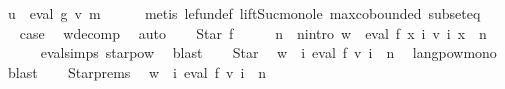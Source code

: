 \begin{isabellebody}
\ {\isachardoublequoteopen}u{\isacharprime}{\kern0pt}\ {\isasymin}\ eval\ g\ {\isacharparenleft}{\kern0pt}v\ {\isacharquery}{\kern0pt}m{\isacharparenright}{\kern0pt}{\isachardoublequoteclose}\isanewline
\ \ \ \ \isamarkupfalse%
\ {\isacharparenleft}{\kern0pt}metis\ le{\isacharunderscore}{\kern0pt}fun{\isacharunderscore}{\kern0pt}def\ lift{\isacharunderscore}{\kern0pt}Suc{\isacharunderscore}{\kern0pt}mono{\isacharunderscore}{\kern0pt}le\ max{\isachardot}{\kern0pt}cobounded{}\ subset{\isacharunderscore}{\kern0pt}eq{\isacharparenright}{\kern0pt}\isanewline
\ \ \isamarkupfalse%
\ \isamarkupfalse%
\ {\isacharquery}{\kern0pt}case\ \isamarkupfalse%
\ w{\isacharunderscore}{\kern0pt}decomp\ \isamarkupfalse%
\ auto\isanewline
{}\isamarkupfalse%
\isanewline
\ \ \isamarkupfalse%
\ {\isacharparenleft}{\kern0pt}Star\ f{\isacharparenright}{\kern0pt}\isanewline
\ \ \isamarkupfalse%
\ \isamarkupfalse%
\ n\ \ n{\isacharunderscore}{\kern0pt}intro{\isacharcolon}{\kern0pt}\ {\isachardoublequoteopen}w\ {\isasymin}\ {\isacharparenleft}{\kern0pt}eval\ f\ {\isacharparenleft}{\kern0pt}{\isasymlambda}x{\isachardot}{\kern0pt}\ {\isasymUnion}i{\isachardot}{\kern0pt}\ v\ i\ x{\isacharparenright}{\kern0pt}{\isacharparenright}{\kern0pt}\ {\isacharcircum}{\kern0pt}{\isacharcircum}{\kern0pt}\ n{\isachardoublequoteclose}\isanewline
\ \ \ \ \isamarkupfalse%
\ eval{\isachardot}{\kern0pt}simps{\isacharparenleft}{\kern0pt}{}{\isacharparenright}{\kern0pt}\ star{\isacharunderscore}{\kern0pt}pow\ \isamarkupfalse%
\ blast\isanewline
\ \ \isamarkupfalse%
\ Star\ \isamarkupfalse%
\ {\isachardoublequoteopen}w\ {\isasymin}\ {\isacharparenleft}{\kern0pt}{\isasymUnion}i{\isachardot}{\kern0pt}\ eval\ f\ {\isacharparenleft}{\kern0pt}v\ i{\isacharparenright}{\kern0pt}{\isacharparenright}{\kern0pt}\ {\isacharcircum}{\kern0pt}{\isacharcircum}{\kern0pt}\ n{\isachardoublequoteclose}\ \isamarkupfalse%
\ langpow{\isacharunderscore}{\kern0pt}mono\ \isamarkupfalse%
\ blast\isanewline
\ \ \isamarkupfalse%
\ Star{\isachardot}{\kern0pt}prems\ \isamarkupfalse%
\ {\isachardoublequoteopen}w\ {\isasymin}\ {\isacharparenleft}{\kern0pt}{\isasymUnion}i{\isachardot}{\kern0pt}\ eval\ f\ {\isacharparenleft}{\kern0pt}v\ i{\isacharparenright}{\kern0pt}\ {\isacharcircum}{\kern0pt}{\isacharcircum}{\kern0pt}\ n{\isacharparenright}{\kern0pt}{\isachardoublequoteclose}\ \isamarkupfalse%

\end{isabellebody}
